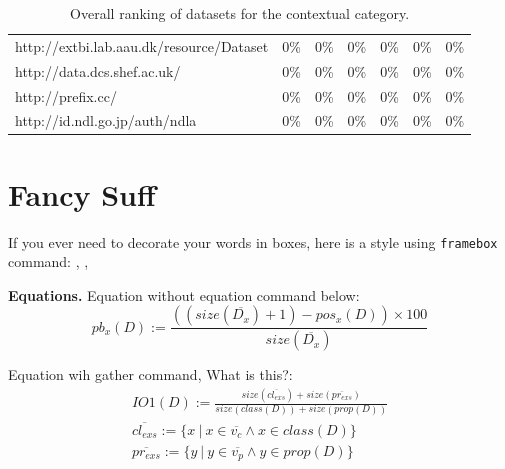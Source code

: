 \documentclass{sig-alternate-05-2015}
\begin{document}
\begin{table}[]
\begin{tabular}{lcccccc}
\multicolumn{1}{l|}{http://extbi.lab.aau.dk/resource/Dataset} & \multicolumn{1}{c|}{0\%}               & \multicolumn{1}{c|}{0\%}         & \multicolumn{1}{c|}{0\%}         & \multicolumn{1}{c|}{0\%}         & \multicolumn{1}{c|}{0\%}         & 0\%         \\
\multicolumn{1}{l|}{http://data.dcs.shef.ac.uk/}              & \multicolumn{1}{c|}{0\%}               & \multicolumn{1}{c|}{0\%}         & \multicolumn{1}{c|}{0\%}         & \multicolumn{1}{c|}{0\%}         & \multicolumn{1}{c|}{0\%}         & 0\%         \\
\multicolumn{1}{l|}{http://prefix.cc/}                        & \multicolumn{1}{c|}{0\%}               & \multicolumn{1}{c|}{0\%}         & \multicolumn{1}{c|}{0\%}         & \multicolumn{1}{c|}{0\%}         & \multicolumn{1}{c|}{0\%}         & 0\%         \\
\multicolumn{1}{l|}{http://id.ndl.go.jp/auth/ndla}            & \multicolumn{1}{c|}{0\%}               & \multicolumn{1}{c|}{0\%}         & \multicolumn{1}{c|}{0\%}         & \multicolumn{1}{c|}{0\%}         & \multicolumn{1}{c|}{0\%}         & 0\%    \\ \hline
\end{tabular}
\caption{Overall ranking of datasets for the contextual category.}
\label{tbl:tb5ContextualOverall}
\end{table}


\section{Fancy Suff}\label{fancies}

If you ever need to decorate your words in boxes, here is a style using \texttt{{\color{cyan}framebox}} command: , , 

\textbf{Equations.} Equation without equation command below:
$$ pb_x(D) := \frac{((\mathit{size}(\overline{D_x}) + 1) - \mathit{pos_x}(\mathit{D})) \times 100}{size(\overline{D_x})}$$


Equation wih gather command, What is this?:
\begin{gather*}
\mathit{IO1}(D) := \frac{\mathit{size}(\overline{\mathit{cl_{exs}}}) + \mathit{size}(\overline{\mathit{pr_{exs}}})}{\mathit{size}(\mathit{class}(D)) + \mathit{size}(\mathit{prop}(D))} \\
\overline{\mathit{cl_{exs}}} := \{x~|~x \in \overline{v_c} \wedge x \in \mathit{class}(D) \} \\
\overline{\mathit{pr_{exs}}} := \{y~|~y \in \overline{v_p} \wedge y \in \mathit{prop}(D)\}
\end{gather*}
\end{document}

